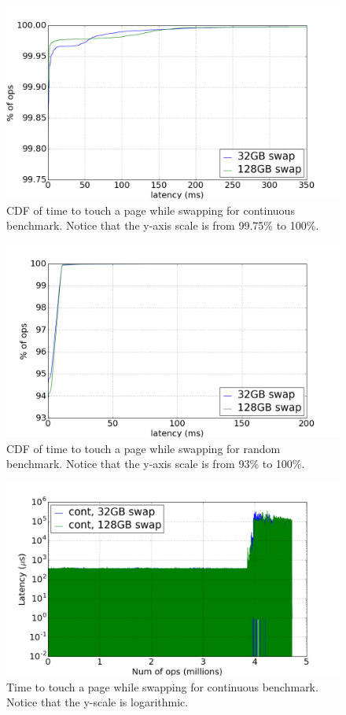 \documentclass[twocolumn,11pt]{article}
\begin{document}
\begin{figure}
    \includegraphics[width=\columnwidth]{figures/swap_touch_time_cont_cdf}
    \caption{CDF of time to touch a page while swapping for continuous
    benchmark. Notice that the y-axis scale is from 99.75\% to 100\%.
    \label{fig:swap_time_cont_cdf}}
\end{figure}

\begin{figure}
    \includegraphics[width=\columnwidth]{figures/swap_touch_time_rand_cdf}
    \caption{CDF of time to touch a page while swapping for random benchmark.
    Notice that the y-axis scale is from 93\% to 100\%.\label{fig:swap_time_rand_cdf}}
\end{figure}

\begin{figure}
    \includegraphics[width=\columnwidth]{figures/swap_time_cont}
    \caption{Time to touch a page while swapping for continuous benchmark.
    Notice that the y-scale is logarithmic.\label{fig:swap_time_cont}}
\end{figure}
\end{document}
